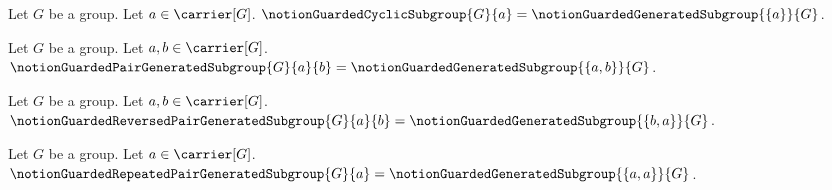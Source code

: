 

\begin{definition}\label{notion_guarded_cyclic_subgroup}
    Let $G$ be a group.
    Let $a\in\carrier[G]$.
    $\notionGuardedCyclicSubgroup{G}{a}=
        \notionGuardedGeneratedSubgroup{\{a\}}{G}$.
\end{definition}

\begin{definition}\label{notion_guarded_pair_generated_subgroup}
    Let $G$ be a group.
    Let $a,b\in\carrier[G]$.
    $\notionGuardedPairGeneratedSubgroup{G}{a}{b}=
        \notionGuardedGeneratedSubgroup{\{a,b\}}{G}$.
\end{definition}

\begin{definition}\label{notion_guarded_reversed_pair_generated_subgroup}
    Let $G$ be a group.
    Let $a,b\in\carrier[G]$.
    $\notionGuardedReversedPairGeneratedSubgroup{G}{a}{b}=
        \notionGuardedGeneratedSubgroup{\{b,a\}}{G}$.
\end{definition}

\begin{definition}\label{notion_guarded_repeated_pair_generated_subgroup}
    Let $G$ be a group.
    Let $a\in\carrier[G]$.
    $\notionGuardedRepeatedPairGeneratedSubgroup{G}{a}=
        \notionGuardedGeneratedSubgroup{\{a,a\}}{G}$.
\end{definition}

